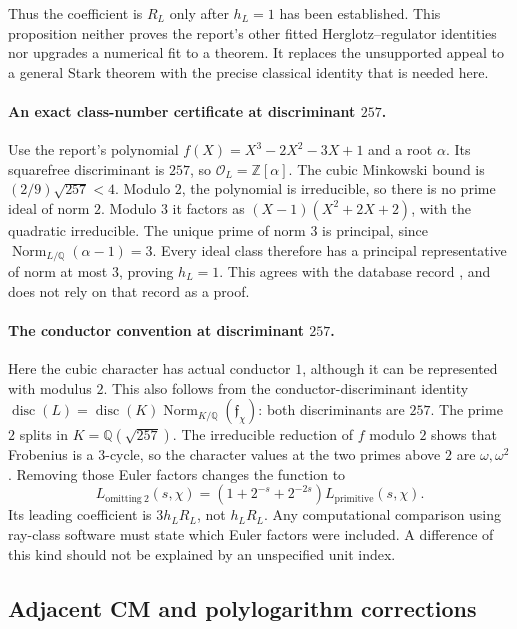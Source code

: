 \documentclass[11pt]{article}
\numberwithin{equation}{section}
\theoremstyle{definition}
\theoremstyle{remark}
\newcommand{\Q}{\mathbb Q}
\newcommand{\Z}{\mathbb Z}
\begin{document}
Thus the coefficient is $R_L$ only after $h_L=1$ has been
established. This proposition neither proves the report's other
fitted Herglotz--regulator identities nor upgrades a numerical fit to
a theorem. It replaces the unsupported appeal to a general Stark
theorem with the precise classical identity that is needed here.

\paragraph{An exact class-number certificate at discriminant $257$.}
Use the report's polynomial $f(X)=X^3-2X^2-3X+1$ and a root
$\alpha$. Its squarefree discriminant is $257$, so
$\mathcal O_L=\Z[\alpha]$. The cubic Minkowski bound is
$(2/9)\sqrt{257}<4$. Modulo $2$, the polynomial is irreducible,
so there is no prime ideal of norm $2$. Modulo $3$ it factors as
$(X-1)(X^2+2X+2)$, with the quadratic irreducible. The unique
prime of norm $3$ is principal, since
$\operatorname{Norm}_{L/\Q}(\alpha-1)=3$.
Every ideal class therefore has a principal representative of norm
at most $3$, proving $h_L=1$. This agrees with the database record
\cite{LMFDB257}, and does not rely on that record as a proof.

\paragraph{The conductor convention at discriminant $257$.}
Here the cubic character has actual conductor $1$, although it can
be represented with modulus $2$. This also follows from the
conductor-discriminant identity
$\operatorname{disc}(L)=\operatorname{disc}(K)
\operatorname{Norm}_{K/\Q}(\mathfrak f_\chi)$:
both discriminants are $257$.
The prime $2$ splits in $K=\Q(\sqrt{257})$.
The irreducible reduction of $f$ modulo $2$ shows that Frobenius
is a $3$-cycle, so the character values at the two primes above
$2$ are $\omega,\omega^2$. Removing those Euler factors changes
the function to
\begin{equation}\label{eq:imprimitive}
 L_{\mathrm{omitting}\ 2}(s,\chi)
 =(1+2^{-s}+2^{-2s})L_{\mathrm{primitive}}(s,\chi).
\end{equation}
Its leading coefficient is $3h_LR_L$, not $h_LR_L$.
Any computational comparison using ray-class software must state
which Euler factors were included. A difference of this kind should
not be explained by an unspecified unit index.

\subsection{Adjacent CM and polylogarithm corrections}
\end{document}
